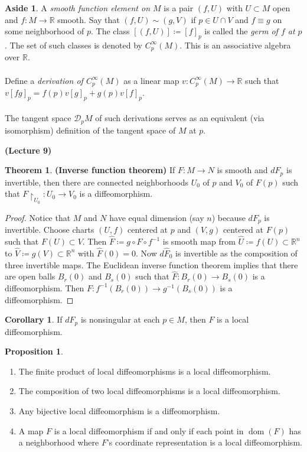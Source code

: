 \documentclass[10pt,letterpaper,cm]{nupset}
\theoremstyle{definition}
\newtheorem{theorem}{Theorem}
\newtheorem{corollary}{Corollary}
\newtheorem*{aside}{Aside}
\newtheorem{prop}{Proposition}
\newcommand{\R}{\mathbb R}
\newcommand{\1}{\mathbf{1}}
\newcommand{\0}{\vec 0}
\DeclareMathOperator{\dom}{dom}
\begin{document}
\begin{aside}
A \textit{smooth function element on $M$} is a pair $(f, U)$ with $U\subset M$ open and $f: M \to \R$ smooth. Say that $(f, U) \sim (g, V)$ if $p\in U \cap V$ and $f \equiv g$ on some neighborhood of $p$. The class $[(f, U)]\coloneqq [f]_p$ is called the \textit{germ of $f$ at $p$}. The set of such classes is denoted by $C^{\infty}_p(M)$. This is an associative algebra over $\R$. \\ \\ Define a \textit{derivation of $C^{\infty}_p(M)$} as a linear map $v: C^{\infty}_p(M) \to \R$ such that $v[fg]_p = f(p)v[g]_p+g(p)v[f]_p$.  \\ \\ The tangent space $\mathcal{D}_pM$ of such derivations serves as an equivalent (via isomorphism) definition of the tangent space of $M$ at $p$.
\end{aside}

\begin{center}
{\textbf{(Lecture 9)}} 
\end{center}

\begin{theorem}{\textbf{(Inverse function theorem)}}
If $F: M \to N$ is smooth and $dF_p$ is invertible, then there are connected neighborhoods  $U_0$ of $p$ and $V_0$ of $F(p)$ such that $F\restriction_{U_0}: U_0 \to V_0$ is a diffeomorphism.
\end{theorem}
\begin{proof}
Notice that $M$ and $N$ have equal dimension (say $n$) because $dF_p$ is invertible. Choose charts $(U, f)$ centered at $p$ and $(V, g)$ centered at $F(p)$ such that $F(U) \subset V$. Then $\widehat{F}\coloneqq  g \circ F \circ f^{-1}$ is smooth map from $\widehat{U}\coloneqq f(U)\subset \R^n$ to $\widehat{V}\coloneqq g(V)\subset \R^n$ with $\widehat{F}(0) =0$. Now $d\widehat{F}_0$ is invertible as the composition of three invertible maps. The Euclidean inverse function theorem implies that there are open balls $B_{r}(0)$ and $B_s(0)$ such that $\widehat{F} : B_r(0) \to B_s(0)$ is a diffeomorphism. Then $F: f^{-1}(B_r(0)) \to g^{-1}(B_s(0))$ is a diffeomorphism.
\end{proof}

\begin{corollary}
If $dF_p$ is nonsingular at each $p\in M$, then $F$ is a local diffeomorphism.
\end{corollary}

\begin{prop} $ $
\begin{enumerate}
\item The finite product of local diffeomorphisms is a local diffeomorphism.
\item The composition of two local diffeomorphisms is a local diffeomorphism.
\item Any bijective local diffeomorphism is a diffeomorphism.
\item A map $F$ is a local diffeomorphism if and only if each point in $\dom(F)$ has a neighborhood where $F$'s coordinate representation is a local diffeomorphism.
\end{enumerate}
\end{prop}
\end{document}

